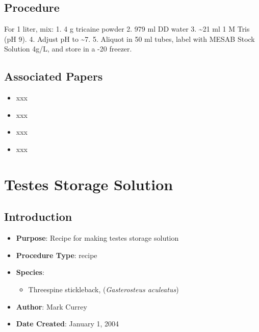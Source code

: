 \documentclass[
  letterpaper,
  DIV=11,
  numbers=noendperiod]{scrreprt}
\providecommand{\tightlist}{%
  \setlength{\itemsep}{0pt}\setlength{\parskip}{0pt}}\usepackage{longtable,booktabs,array}
\begin{document}
\hypertarget{procedure-64}{%
\section{Procedure}\label{procedure-64}}

For 1 liter, mix: 1. 4 g tricaine powder 2. 979 ml DD water 3.
\textasciitilde21 ml 1 M Tris (pH 9). 4. Adjust pH to \textasciitilde7.
5. Aliquot in 50 ml tubes, label with MESAB Stock Solution 4g/L, and
store in a -20 freezer.

\hypertarget{associated-papers-44}{%
\section{Associated Papers}\label{associated-papers-44}}

\begin{itemize}
\tightlist
\item
  xxx
\item
  xxx
\item
  xxx
\item
  xxx
\end{itemize}

\hypertarget{sec-general_recipe_testes_solution}{%
\chapter{Testes Storage
Solution}\label{sec-general_recipe_testes_solution}}

\hypertarget{introduction-69}{%
\section{Introduction}\label{introduction-69}}

\begin{itemize}
\tightlist
\item
  \textbf{Purpose}: Recipe for making testes storage solution\\
\item
  \textbf{Procedure Type}: recipe
\item
  \textbf{Species}:

  \begin{itemize}
  \tightlist
  \item
    Threespine stickleback, (\emph{Gasterosteus aculeatus})
  \end{itemize}
\item
  \textbf{Author}: Mark Currey
\item
  \textbf{Date Created}: January 1, 2004
\end{itemize}
\end{document}
